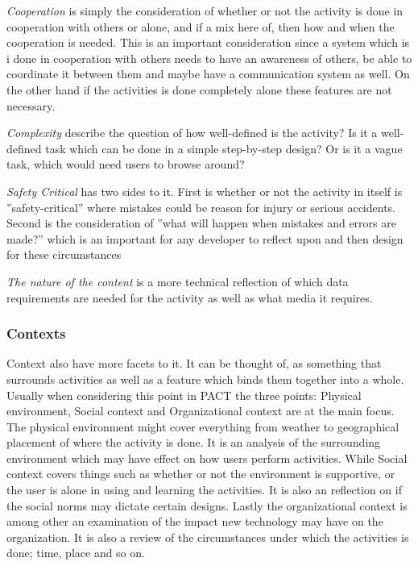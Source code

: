 \textit{Cooperation} is simply the consideration of whether or not the activity is done in cooperation with others or alone, and if a mix here of, then how and when the cooperation is needed.
This is an important consideration since a system which is i done in cooperation with others needs to have an awareness of others, be able to coordinate it between them and maybe have a communication system as well.
On the other hand if the activities is done completely alone these features are not necessary. 

\textit{Complexity} describe the question of how well-defined is the activity?
Is it a well-defined task which can be done in a simple step-by-step design?
Or is it a vague task, which would need users to browse around?

\textit{Safety Critical} has two sides to it.
First is whether or not the activity in itself is ''safety-critical'' where mistakes could be reason for injury or serious accidents.
Second is the consideration of ''what will happen when mistakes and errors are made?'' which is an important for any developer to reflect upon and then design for these circumstances

\textit{The nature of the content} is a more technical reflection of which data requirements are needed for the activity as well as what media it requires.

\subsubsection{Contexts}
Context also have more facets to it.
It can be thought of, as something that surrounds activities as well as a feature which binds them together into a whole.
Usually when considering this point in PACT the three points: Physical environment, Social context and Organizational context are at the main focus.
\\\indent
The physical environment might cover everything from weather to geographical placement of where the activity is done. 
It is an analysis of the surrounding environment which may have effect on how users perform activities.
While Social context covers things such as whether or not the environment is supportive, or the user is alone in using and learning the activities. 
It is also an reflection on if the social norms may dictate certain designs.
Lastly the organizational context is among other an examination of the impact new technology may have on the organization. 
It is also a review of the circumstances under which the activities is done; time, place and so on.

